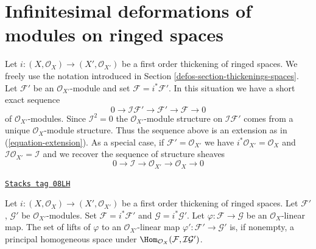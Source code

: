 \section{Infinitesimal deformations of modules on ringed spaces}
\label{defos-section-deformation-modules}
Let $i : (X, \mathcal{O}_X) \to (X', \mathcal{O}_{X'})$ be a first
order thickening of ringed spaces. We freely use the notation introduced in
Section \ref{defos-section-thickenings-spaces}.
Let $\mathcal{F}'$ be an $\mathcal{O}_{X'}$-module
and set $\mathcal{F} = i^*\mathcal{F}'$.
In this situation we have a short exact sequence
$$
0 \to \mathcal{I}\mathcal{F}' \to \mathcal{F}' \to \mathcal{F} \to 0
$$
of $\mathcal{O}_{X'}$-modules. Since $\mathcal{I}^2 = 0$ the
$\mathcal{O}_{X'}$-module structure on $\mathcal{I}\mathcal{F}'$
comes from a unique $\mathcal{O}_X$-module structure.
Thus the sequence above is an extension as in (\ref{equation-extension}).
As a special case, if $\mathcal{F}' = \mathcal{O}_{X'}$ we have
$i^*\mathcal{O}_{X'} = \mathcal{O}_X$ and
$\mathcal{I}\mathcal{O}_{X'} = \mathcal{I}$ and we recover the
sequence of structure sheaves
$$
0 \to \mathcal{I} \to \mathcal{O}_{X'} \to \mathcal{O}_X \to 0
$$

\begin{lemma}
\label{defos-lemma-inf-map-special}
\href{https://stacks.math.columbia.edu/tag/08LH}{\texttt{Stacks tag 08LH}}

Let $i : (X, \mathcal{O}_X) \to (X', \mathcal{O}_{X'})$
be a first order thickening of ringed spaces.
Let $\mathcal{F}'$, $\mathcal{G}'$ be $\mathcal{O}_{X'}$-modules.
Set $\mathcal{F} = i^*\mathcal{F}'$ and $\mathcal{G} = i^*\mathcal{G}'$.
Let $\varphi : \mathcal{F} \to \mathcal{G}$ be an $\mathcal{O}_X$-linear map.
The set of lifts of $\varphi$ to an $\mathcal{O}_{X'}$-linear map
$\varphi' : \mathcal{F}' \to \mathcal{G}'$ is, if nonempty, a principal
homogeneous space under
$\Hom_{\mathcal{O}_X}(\mathcal{F}, \mathcal{I}\mathcal{G}')$.
\end{lemma}

